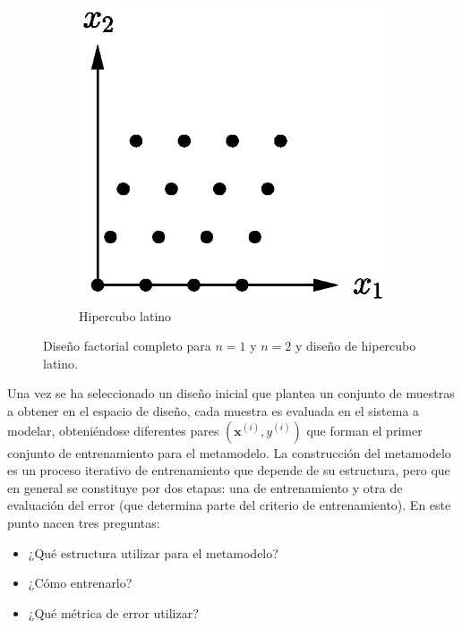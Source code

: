 \begin{figure}[t]
\begin{subfigure}[b]{0.32\textwidth}
        \includegraphics[scale=0.55]{../img/Construccion_de_un_Metamodelo/dimensionality3.eps}
        \caption{Hipercubo latino}
        \label{fig:dimensionality3}
    \end{subfigure}
    \caption{Diseño factorial completo para $n=1$ y $n=2$ y diseño de hipercubo latino.}\label{fig:dimensionality}
\end{figure}

Una vez se ha seleccionado un diseño inicial que plantea un conjunto de muestras a obtener en el espacio de diseño, cada muestra es evaluada en el sistema a modelar, obteniéndose diferentes pares $(\mathbf{x}^{(i)},y^{(i)})$ que forman el primer conjunto de entrenamiento para el metamodelo. La construcción del metamodelo es un proceso iterativo de entrenamiento que depende de su estructura, pero que en general se constituye por dos etapas: una de entrenamiento y otra de evaluación del error (que determina parte del criterio de entrenamiento). En este punto nacen tres preguntas:
\begin{itemize}
\item ¿Qué estructura utilizar para el metamodelo?
\item ¿Cómo entrenarlo?
\item ¿Qué métrica de error utilizar?
\end{itemize}

